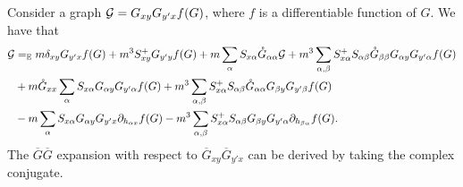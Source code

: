  
\begin{lemma} \label{T eq0}
Consider a graph $\cal G= G_{xy}   G_{y' x }  f (G)$, where $f$ is a differentiable function of $G$. We have that 
\begin{align}
 \cal G& =_{\E} m\delta_{xy}G_{y' x}f(G)+  m^3  S^{+}_{xy} G_{y' y} f(G)  + m \sum_\al  S_{x\al} \Gc_{\al \al} \cal G + m^3 \sum_{\al,\beta}  S^{+}_{x\al}  S_{\al\beta} \Gc_{\beta \beta} G_{\al y}   G_{y'\al} f(G) \nonumber \\
    &  + m\Gc_{xx }    \sum_\al S_{x\al}G_{\al y}   G_{y'\al} f(G) + m^3 \sum_{\al,\beta}  S^+_{x\al} S_{\al\beta}  \Gc_{\al\al }  G_{\beta y}   G_{y'\beta} f(G)  \nonumber\\
    & - m \sum_{ \al}  S_{x\al}G_{\al y} G_{y' x} \partial_{ h_{\al x}}f(G) - m^3 \sum_{\al,\beta} S^{+}_{x\al} S_{\al\beta}G_{\beta y} G_{y' \al} \partial_{ h_{\beta \al}}f(G)  . \label{Oe2x}
    \end{align}
The $\overline G \overline G$ expansion with respect to $\overline G_{xy}  \overline G_{y' x }$ can be derived by taking the complex conjugate.
\end{lemma} 

